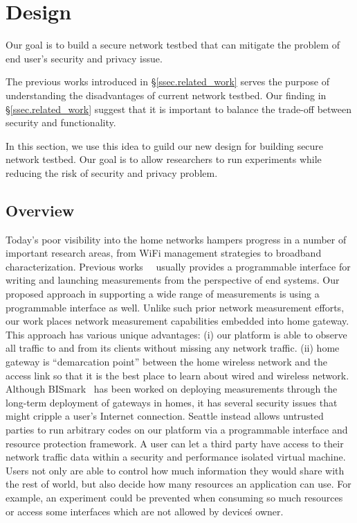 \section{Design}
\label{sec.design}
Our goal is to build a secure network testbed that can mitigate the problem 
of end user's security and privacy issue. 

The previous works introduced in \S{\ref{ssec.related_work}} serves the 
purpose of understanding the disadvantages of current network testbed. Our 
finding in \S{\ref{ssec.related_work}} suggest that it is important to 
balance the trade-off between security and functionality.

In this section, we use this idea to guild our new design for building 
secure network testbed. Our goal is to allow researchers to run experiments 
while reducing the risk of security and privacy problem.

\subsection{Overview}
Today's poor visibility into the home networks hampers progress in a number 
of important research areas, from WiFi management strategies to broadband 
characterization. Previous works~\cite{sanchez2014measurement}~\cite{
dhawan2012fathom} usually provides a programmable interface for writing and 
launching measurements from the perspective of end systems. Our proposed 
approach in supporting a wide range of measurements is using a programmable 
interface as well. Unlike such prior network measurement efforts, our work 
places network measurement capabilities embedded into home gateway. This 
approach has various unique advantages: (i) our platform is able to observe 
all traffic to and from its clients without missing any network traffic. (ii)
home gateway is “demarcation point” between the home wireless network and 
the access link so that it is the best place to learn about wired and 
wireless network. Although BISmark~\cite{183951} has been worked on 
deploying measurements  through the long-term deployment of gateways in 
homes, it has several security issues that might cripple a user's Internet 
connection. Seattle instead allows untrusted parties to run arbitrary codes 
on our platform via a programmable interface and resource protection 
framework. A user can let a third party have access to their network traffic 
data within a security and performance isolated virtual machine. Users not 
only are able to control how much information they would share with the rest 
of world, but also decide how many resources an application can use. For 
example, an experiment could be prevented when consuming so much resources 
or access some interfaces which are not allowed by device\'s owner. 

